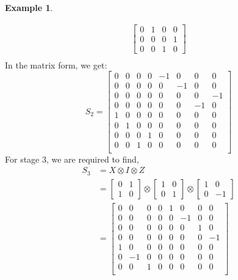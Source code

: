 \documentclass[12pt, oneside]{book}
\theoremstyle{definition}
\theoremstyle{definition}
\newtheorem{example}{Example}[section]
\theoremstyle{remark}
\begin{document}
\begin{example}
\begin{enumerate}
\begin{align*}
\begin{bmatrix}
            0 & 1 & 0 & 0 \\
            0 & 0 & 0 & 1 \\
            0 & 0 & 1 & 0 \end{bmatrix} \\
        \end{align*}
        In the matrix form, we get:
        \[
            S_2=\begin{bmatrix}
                0 & 0 & 0 & 0 & -1 & 0 & 0 & 0 \\
                0 & 0 & 0 & 0 & 0 & -1 & 0 & 0 \\
                0 & 0 & 0 & 0 & 0 & 0 & 0 & -1 \\
                0 & 0 & 0 & 0 & 0 & 0 & -1 & 0 \\
                1 & 0 & 0 & 0 & 0 & 0 & 0 & 0 \\
                0 & 1 & 0 & 0 & 0 & 0 & 0 & 0 \\
                0 & 0 & 0 & 1 & 0 & 0 & 0 & 0 \\
                0 & 0 & 1 & 0 & 0 & 0 & 0 & 0 \\
            \end{bmatrix}
        \]
        For stage 3, we are required to find,
        \begin{align*}
            S_3 &= X \otimes I \otimes Z \\
            &= \begin{bmatrix} 0 & 1 \\ 1 & 0 \end{bmatrix} \otimes \begin{bmatrix} 1 & 0 \\ 0 & 1 \end{bmatrix} \otimes \begin{bmatrix} 1 & 0 \\ 0 & -1 \end{bmatrix} \\
            &= \begin{bmatrix} 0 & 0 & 0 & 0 & 1 & 0 & 0 & 0 \\
                0 & 0 & 0 & 0 & 0 & -1 & 0 & 0 \\
                0 & 0 & 0 & 0 & 0 & 0 & 1 & 0 \\
                0 & 0 & 0 & 0 & 0 & 0 & 0 & -1 \\
                1 & 0 & 0 & 0 & 0 & 0 & 0 & 0 \\
                0 & -1 & 0 & 0 & 0 & 0 & 0 & 0 \\
                0 & 0 & 1 & 0 & 0 & 0 & 0 & 0 \\

\end{bmatrix}
\end{align*}
\end{enumerate}
\end{example}
\end{document}
